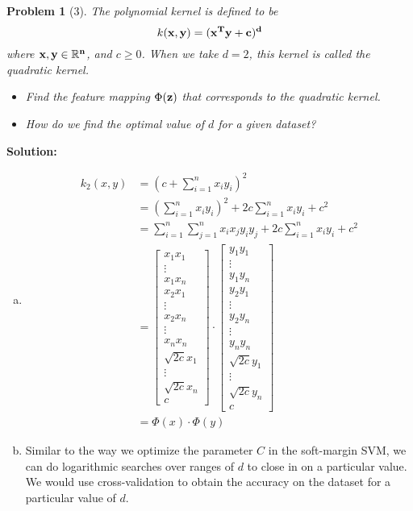 \documentclass[11pt]{article}
\theoremstyle{quest}
\newtheorem*{question}{Problem}
\begin{document}
\begin{question}[3]
The polynomial kernel is defined to be
\[
k(\bf{x},\bf{y}) = (\bf{x}^T\bf{y} + c)^d
\]
where $\bf{x},\bf{y} \in \mathbb{R}^n$, and $c \geq 0$. When we take $d=2$, this kernel is called the quadratic kernel.
\begin{itemize}
\item[(a)] Find the feature mapping $\Phi(\bf{z})$ that corresponds to the quadratic kernel.
\item[(b)] How do we find the optimal value of $d$ for a given dataset?
\end{itemize}
\end{question}
\vspace{12pt}
\textbf{Solution:}
\begin{enumerate}[(a)]
\item \begin{align*}
k_2(x,y) &= (c+\sum_{i=1}^n x_iy_i)^2\\
&= (\sum_{i=1}^n x_iy_i)^2 + 2c\sum_{i=1}^n x_iy_i + c^2\\
&= \sum_{i=1}^n\sum_{j=1}^n x_ix_jy_iy_j + 2c\sum_{i=1}^n x_iy_i + c^2\\
&= \begin{bmatrix}x_1x_1\\\vdots\\x_1x_n\\x_2x_1\\\vdots\\x_2x_n\\\vdots\\x_nx_n\\\sqrt{2c}x_1\\\vdots\\\sqrt{2c}x_n\\c\end{bmatrix}\cdot\begin{bmatrix}y_1y_1\\\vdots\\y_1y_n\\y_2y_1\\\vdots\\y_2y_n\\\vdots\\y_ny_n\\\sqrt{2c}y_1\\\vdots\\\sqrt{2c}y_n\\c\end{bmatrix}\\
&= \Phi(x)\cdot\Phi(y)
\end{align*}
\item Similar to the way we optimize the parameter $C$ in the soft-margin SVM, we can do logarithmic searches over ranges of $d$ to close in on a particular value. We would use cross-validation to obtain the accuracy on the dataset for a particular value of $d$.
\end{enumerate}
\newpage
\end{document}
